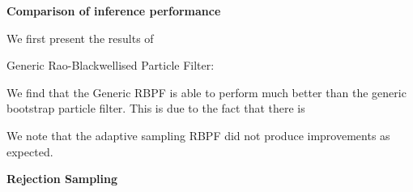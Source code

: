 \documentclass[../main.tex]{subfiles}
\begin{document}
	

\textbf{Comparison of inference performance}

We first present the results of 


Generic Rao-Blackwellised Particle Filter:

We find that the Generic RBPF is able to perform much better than the generic bootstrap particle filter. This is due to the fact that there is 

We note that the adaptive sampling RBPF did not produce improvements as expected. 





\textbf{Rejection Sampling }
	
	
	
\end{document}
